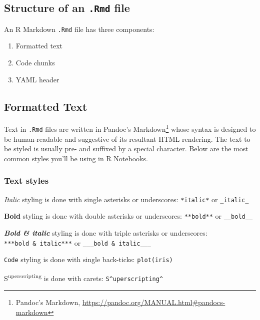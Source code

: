 \documentclass[]{article}
\providecommand{\tightlist}{%
  \setlength{\itemsep}{0pt}\setlength{\parskip}{0pt}}
\let\rmarkdownfootnote\footnote%
\def\footnote{\protect\rmarkdownfootnote}
\begin{document}
\hypertarget{structure-of-an-.rmd-file}{%
\subsection{\texorpdfstring{Structure of an \texttt{.Rmd}
file}{Structure of an .Rmd file}}\label{structure-of-an-.rmd-file}}

An R Markdown \texttt{.Rmd} file has three components:

\begin{enumerate}
\def\labelenumi{\arabic{enumi}.}
\tightlist
\item
  Formatted text
\item
  Code chunks
\item
  YAML header
\end{enumerate}

\hypertarget{formatted-text}{%
\subsection{Formatted Text}\label{formatted-text}}

Text in \texttt{.Rmd} files are written in Pandoc's Markdown\footnote{Pandoc's
  Markdown, \url{https://pandoc.org/MANUAL.html\#pandocs-markdown}}
whose syntax is designed to be human-readable and suggestive of its
resultant HTML rendering. The text to be styled is usually pre- and
suffixed by a special character. Below are the most common styles you'll
be using in R Notebooks.

\hypertarget{text-styles}{%
\subsubsection{Text styles}\label{text-styles}}

\emph{Italic} styling is done with single asterisks or underscores:
\texttt{*italic*} or \texttt{\_italic\_}

\textbf{Bold} styling is done with double asterisks or underscores:
\texttt{**bold**} or \texttt{\_\_bold\_\_}

\textbf{\emph{Bold \& italic}} styling is done with triple asterisks or
underscores: \texttt{***bold\ \&\ italic***} or
\texttt{\_\_\_bold\ \&\ italic\_\_\_}

\texttt{Code} styling is done with single back-ticks:
\texttt{\textasciigrave{}plot(iris)\textasciigrave{}}

S\textsuperscript{uperscripting} is done with carets:
\texttt{S\^{}uperscripting\^{}}
\end{document}
